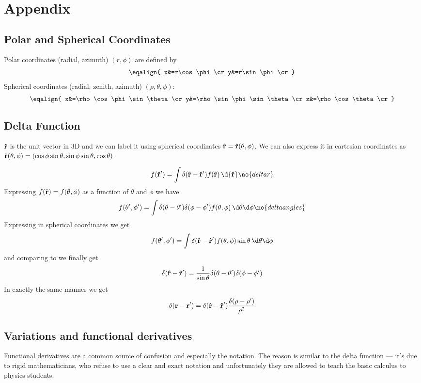 \chapter{Appendix}

\section{Polar and Spherical Coordinates}

Polar coordinates (radial, azimuth) $(r,\phi)$ are defined by
$$\eqalign{
x&=r\cos\phi\cr
y&=r\sin\phi\cr
}$$
Spherical coordinates (radial, zenith, azimuth) $(\rho,\theta,\phi)$:
$$\eqalign{
x&=\rho\cos\phi\sin\theta\cr
y&=\rho\sin\phi\sin\theta\cr
z&=\rho\cos\theta\cr
}$$

\section{Delta Function}

${\bf\hat r}$ is the unit vector in 3D and we can label it using
spherical coordinates ${\bf\hat r}={\bf\hat r}(\theta,\phi)$. We can also
express it in cartesian coordinates as 
${\bf\hat r}(\theta,\phi)=(\cos\phi\sin\theta,\sin\phi\sin\theta,\cos\theta)$.

$$f({\bf\hat r'})=\int\delta({\bf\hat r}-{\bf\hat r'})f({\bf\hat r})\,\d
{\bf\hat r}\no{deltar}$$
Expressing $f({\bf\hat r})=f(\theta,\phi)$ as a function of $\theta$ and $\phi$
we have
$$f(\theta',\phi')=\int\delta(\theta-\theta')\delta(\phi-\phi')
f(\theta,\phi)\,\d\theta\d\phi\no{deltaangles}$$
Expressing  in spherical coordinates we get
$$f(\theta',\phi')=\int\delta({\bf\hat r}-{\bf\hat r'})
f(\theta,\phi)\sin\theta\,\d\theta\d\phi$$
and comparing to  we finally get
$$\delta({\bf\hat r}-{\bf\hat r'})={1\over\sin\theta}
\delta(\theta-\theta')\delta(\phi-\phi')$$
In exactly the same manner we get
$$\delta({\bf r}-{\bf r'})=\delta({\bf\hat r}-{\bf\hat r'})
{\delta(\rho-\rho')\over\rho^2}$$

\section{Variations and functional derivatives}

Functional derivatives are a common source of confusion and especially the
notation. The reason is similar to the delta function --- it's due to rigid
mathematicians, who refuse to use a clear and exact notation and unfortunately
they are allowed to teach the basic calculus to physics students.

